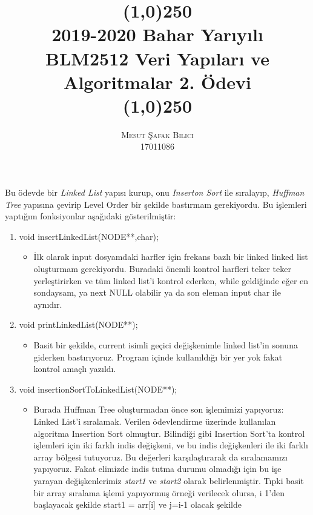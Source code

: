 \documentclass[11pt]{article}
\date{}
\begin{document}
\title{\line(1,0){250} \\ \huge{\textbf{2019-2020 Bahar Yarıyılı\\ BLM2512 Veri Yapıları ve Algoritmalar 2. Ödevi}} \\ \line(1,0){250}}
\author{\textsc{Mesut Şafak Bilici} \\ \textsc{17011086}}
\maketitle

Bu ödevde bir \textit{Linked List} yapısı kurup, onu \textit{Inserton Sort} ile sıralayıp, \textit{Huffman Tree} yapısına çevirip Level Order bir şekilde bastırmam gerekiyordu. Bu işlemleri yaptığım fonksiyonlar aşağıdaki gösterilmiştir:

\begin{enumerate}
\item void insertLinkedList(NODE**,char);
	\begin{itemize}
	\item İlk olarak input dosyamdaki harfler için frekans bazlı bir linked 			  linked list oluşturmam gerekiyordu. Buradaki önemli kontrol
	      harfleri teker teker yerleştirirken ve tüm linked list'i kontrol       		  ederken, while geldiğinde eğer en sondaysam, ya next NULL olabilir 	 		  ya da son eleman input char ile aynıdır. 
	\end{itemize}
\item void printLinkedList(NODE**);
	\begin{itemize}
	\item Basit bir şekilde, current isimli geçici değişkenimle linked   			      list'in sonuna giderken bastırıyoruz. Program içinde kullanıldığı     		  bir yer yok fakat kontrol amaçlı yazıldı.
	\end{itemize}
\item void insertionSortToLinkedList(NODE**);
	\begin{itemize}
	\item Burada Huffman Tree oluşturmadan önce son işlemimizi yapıyoruz: 				  Linked List'i sıralamak. Verilen ödevlendirme üzerinde kullanılan   		  algoritma Insertion Sort olmuştur. Bilindiği gibi Insertion Sort'ta 
		  kontrol işlemleri için iki farklı indis değişkeni, ve bu indis  		       	  değişkenleri ile iki farklı array bölgesi tutuyoruz. Bu değerleri  			  karşılaştırarak da sıralamamızı yapıyoruz. Fakat elimizde indis 	   		  tutma durumu olmadığı için bu işe yarayan değişkenlerimiz 	  				  \textit{start1} ve \textit{start2} olarak belirlenmiştir. Tıpki  				  basit bir array sıralama işlemi yapıyormuş örneği verilecek olursa, 		  i 1'den başlayacak şekilde start1 = arr[i] ve j=i-1 olacak şekilde

\end{itemize}
\end{enumerate}
\end{document}
